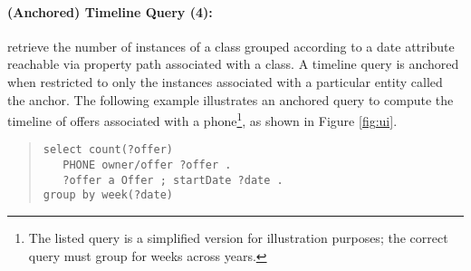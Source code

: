 \paragraph{(Anchored) Timeline Query (4):} retrieve the number of instances of a class grouped according to a date attribute reachable via property path associated with a class.
A timeline query is anchored when restricted to only the instances associated with a particular entity called the anchor.
The following example illustrates an anchored query to compute the timeline of offers associated with a phone\footnote{The listed query is a simplified version for illustration purposes; the correct query must group for weeks across years.}, as shown in Figure \ref{fig:ui}.
\begin{quote}
{\footnotesize
\begin{verbatim}
select count(?offer)
   PHONE owner/offer ?offer .
   ?offer a Offer ; startDate ?date .
group by week(?date)
\end{verbatim}}
\end{quote}
